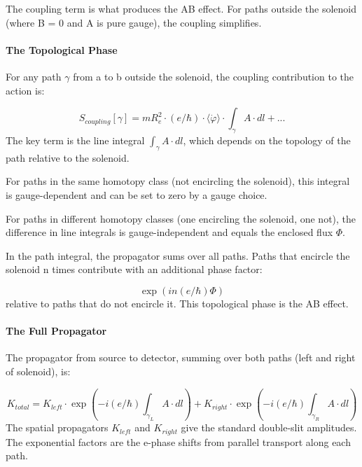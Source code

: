 \documentclass[aps,prd,preprint,superscriptaddress,longbibliography,floatfix]{revtex4-2}
\theoremstyle{remark}
\begin{document}
The coupling term is what produces the AB effect. For paths outside the solenoid (where B = 0 and A is pure gauge), the coupling simplifies.


\paragraph{The Topological Phase}

For any path $\gamma$ from a to b outside the solenoid, the coupling contribution to the action is:


\begin{equation}
    S_{coupling}[\gamma] = mR_e^{2} \cdot (e/\hbar) \cdot \langle\dot{\varphi}\rangle \cdot \int_\gamma A \cdot dl + ...
\end{equation}
The key term is the line integral $\int_\gamma A \cdot dl$, which depends on the topology of the path relative to the solenoid.

For paths in the same homotopy class (not encircling the solenoid), this integral is gauge-dependent and can be set to zero by a gauge choice.

For paths in different homotopy classes (one encircling the solenoid, one not), the difference in line integrals is gauge-independent and equals the enclosed flux $\Phi$.

In the path integral, the propagator sums over all paths. Paths that encircle the solenoid n times contribute with an additional phase factor:


\begin{equation}
    \exp(in(e/\hbar)\Phi)
\end{equation}
relative to paths that do not encircle it. This topological phase is the AB effect.


\paragraph{The Full Propagator}

The propagator from source to detector, summing over both paths (left and right of solenoid), is:


\begin{equation}
    K_{total} = K_{left} \cdot \exp(-i(e/\hbar)\int_{\gamma_L} A \cdot dl) + K_{right} \cdot \exp(-i(e/\hbar)\int_{\gamma_R} A \cdot dl)
\end{equation}
The spatial propagators $K_{left}$ and $K_{right}$ give the standard double-slit amplitudes. The exponential factors are the e-phase shifts from parallel transport along each path.
\end{document}
